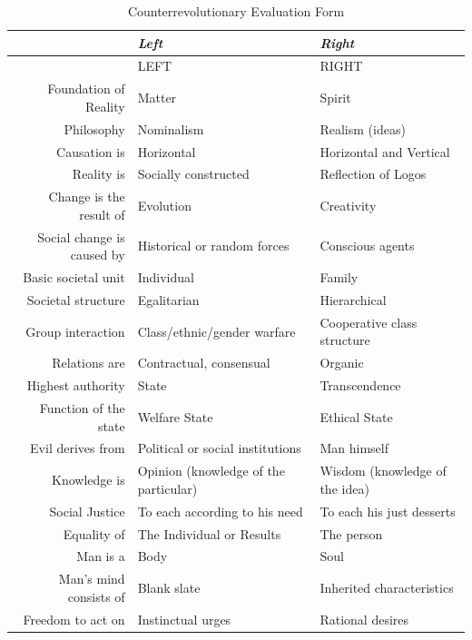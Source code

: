 \begin{small}
\begin{longtable}{@{}rp{}p{}@{}}
\caption{Counterrevolutionary Evaluation Form}\\

\toprule

~ & \textit{Left} & \textit{Right} \\
\midrule

\endfirsthead

\toprule

~ & LEFT & RIGHT \\
\midrule

\endhead

\bottomrule

\endlastfoot

Foundation of Reality & Matter & Spirit \\ Philosophy & Nominalism & Realism (ideas) \\ Causation is & Horizontal & Horizontal and Vertical \\ Reality is & Socially constructed & Reflection of Logos \\ Change is the result of & Evolution & Creativity \\ Social change is caused by & Historical or random forces & Conscious agents \\ Basic societal unit & Individual & Family \\ Societal structure & Egalitarian & Hierarchical \\ Group interaction & Class/ethnic/gender warfare & Cooperative class structure \\ Relations are & Contractual, consensual & Organic \\ Highest authority & State & Transcendence \\ Function of the state & Welfare State & Ethical State \\ Evil derives from & Political or social institutions & Man himself \\ Knowledge is & Opinion (knowledge of the particular) & Wisdom (knowledge of the idea) \\ Social Justice & To each according to his need & To each his just desserts \\ Equality of & The Individual or Results & The person \\ Man is a & Body & Soul \\ Man's mind consists of & Blank slate & Inherited characteristics \\ Freedom to act on & Instinctual urges & Rational desires \\
\end{longtable}\end{small}




